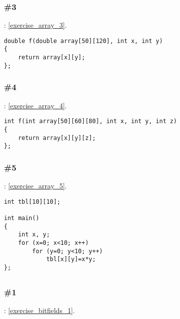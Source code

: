 \subsubsection{\Exercise \#3}
\label{exercise_solutions_arrays_3}

\Exercise: \ref{exercise_array_3}.

\begin{lstlisting}
double f(double array[50][120], int x, int y)
{
	return array[x][y];
};
\end{lstlisting}

\subsubsection{\Exercise \#4}
\label{exercise_solutions_arrays_4}

\Exercise: \ref{exercise_array_4}.

\begin{lstlisting}
int f(int array[50][60][80], int x, int y, int z)
{
	return array[x][y][z];
};
\end{lstlisting}

\subsubsection{\Exercise \#5}
\label{exercise_solutions_arrays_5}

\Exercise: \ref{exercise_array_5}.


\begin{lstlisting}
int tbl[10][10];

int main()
{
	int x, y;
	for (x=0; x<10; x++)
		for (y=0; y<10; y++)
			tbl[x][y]=x*y;
};
\end{lstlisting}


\subsection{}

\subsubsection{\Exercise \#1}
\label{exercise_solutions_bitfields_1}

\Exercise: \ref{exercise_bitfields_1}.

